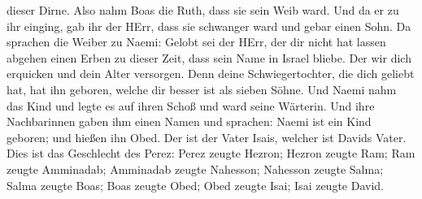 dieser Dirne.  Also nahm Boas die Ruth, dass sie sein Weib
ward. Und da er zu ihr einging, gab ihr der HErr, dass sie schwanger
ward und gebar einen Sohn.  Da sprachen die Weiber zu
Naemi: Gelobt sei der HErr, der dir nicht hat lassen abgehen einen Erben
zu dieser Zeit, dass sein Name in Israel bliebe.  Der wir
dich erquicken und dein Alter versorgen. Denn deine Schwiegertochter,
die dich geliebt hat, hat ihn geboren, welche dir besser ist als sieben
Söhne.  Und Naemi nahm das Kind und legte es auf ihren
Schoß und ward seine Wärterin.  Und ihre Nachbarinnen gaben
ihm einen Namen und sprachen: Naemi ist ein Kind geboren; und hießen ihn
Obed. Der ist der Vater Isais, welcher ist Davids Vater. 
Dies ist das Geschlecht des Perez: Perez zeugte Hezron; 
Hezron zeugte Ram; Ram zeugte Amminadab;  Amminadab zeugte
Nahesson; Nahesson zeugte Salma;  Salma zeugte Boas; Boas
zeugte Obed;  Obed zeugte Isai; Isai zeugte David.
